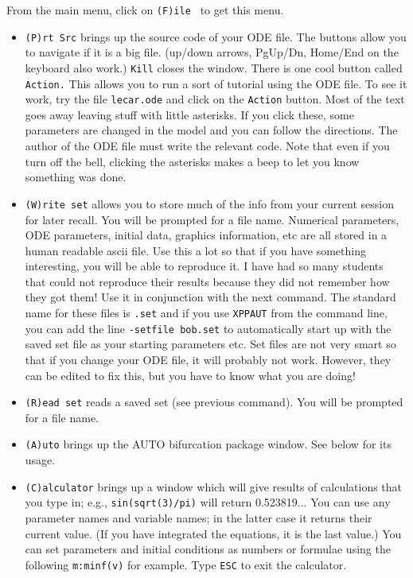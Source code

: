 \documentclass{article}
\begin{document}
\bigskip
{}
From the main menu, click on {\tt (F)ile } to get this menu. 
\begin{itemize}
\item {\tt (P)rt Src} brings up the source code of your ODE file. The buttons allow you to navigate if it is a big file. (up/down arrows, PgUp/Dn, Home/End on the keyboard also work.) {\tt Kill} closes the window. There is one cool button called {\tt Action.} This allows you to run a sort of tutorial using the ODE file. To see it work, try the file {\tt lecar.ode} and click on the {\tt Action} button. Most of the text goes away leaving stuff with little asterisks. If you click these, some parameters are changed in the model and you can follow the directions. The author of the ODE file must write the relevant code.  Note that even if you turn off the bell, clicking the asterisks makes a beep to let you know something was done.
\item {\tt (W)rite set} allows you to store much of the info from your current session for later recall. You will be prompted for a file name. Numerical parameters, ODE parameters, initial data, graphics information, etc are all stored in a human readable ascii file. Use this a lot so that if you have something interesting, you will be able to reproduce it. I have had so many students that could not reproduce their results because they did not remember how they got them! Use it in conjunction with the next command. The standard name for these files is {\tt *.set} and if you use {\tt XPPAUT} from the command line, you can add the line {\tt -setfile bob.set} to automatically start up with the saved set file as your starting parameters etc. Set files are not very smart so that if you change your ODE file, it will probably not work. However, they can be edited to fix this, but you have to know what you are doing!
\item {\tt (R)ead set} reads a saved set (see previous command). You will be prompted for a file name.
\item {\tt (A)uto} brings up the AUTO bifurcation package window. See below for its usage.
\item {\tt (C)alculator} brings up a window which will give results of calculations that you type in; e.g., {\tt sin(sqrt(3)/pi)} will return 0.523819...  You can use any parameter names and variable names; in the latter case it returns their current value. (If you have integrated the equations, it is the last value.) You can set parameters and initial conditions as numbers or formulae using the following {\tt m:minf(v)} for example.  Type {\tt ESC} to exit the calculator.

\end{itemize}
\end{document}
